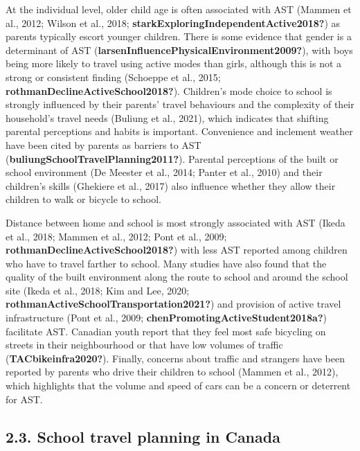 \documentclass[]{elsarticle} %
\begin{document}
At the individual level, older child age is often associated with AST
(Mammen et al., 2012; Wilson et al., 2018;
\textbf{starkExploringIndependentActive2018?}) as parents typically
escort younger children. There is some evidence that gender is a
determinant of AST (\textbf{larsenInfluencePhysicalEnvironment2009?}),
with boys being more likely to travel using active modes than girls,
although this is not a strong or consistent finding (Schoeppe et al.,
2015; \textbf{rothmanDeclineActiveSchool2018?}). Children's mode choice
to school is strongly influenced by their parents' travel behaviours and
the complexity of their household's travel needs (Buliung et al., 2021),
which indicates that shifting parental perceptions and habits is
important. Convenience and inclement weather have been cited by parents
as barriers to AST (\textbf{buliungSchoolTravelPlanning2011?}). Parental
perceptions of the built or school environment (De Meester et al., 2014;
Panter et al., 2010) and their children's skills (Ghekiere et al., 2017)
also influence whether they allow their children to walk or bicycle to
school.

Distance between home and school is most strongly associated with AST
(Ikeda et al., 2018; Mammen et al., 2012; Pont et al., 2009;
\textbf{rothmanDeclineActiveSchool2018?}) with less AST reported among
children who have to travel farther to school. Many studies have also
found that the quality of the built environment along the route to
school and around the school site (Ikeda et al., 2018; Kim and Lee,
2020; \textbf{rothmanActiveSchoolTransportation2021?}) and provision of
active travel infrastructure (Pont et al., 2009;
\textbf{chenPromotingActiveStudent2018a?}) facilitate AST. Canadian
youth report that they feel most safe bicycling on streets in their
neighbourhood or that have low volumes of traffic
(\textbf{TACbikeinfra2020?}). Finally, concerns about traffic and
strangers have been reported by parents who drive their children to
school (Mammen et al., 2012), which highlights that the volume and speed
of cars can be a concern or deterrent for AST.

\hypertarget{school-travel-planning-in-canada}{%
\subsection{2.3. School travel planning in
Canada}\label{school-travel-planning-in-canada}}
\end{document}
